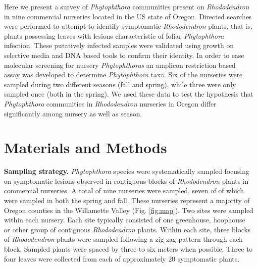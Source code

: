 \documentclass[12pt]{article}
\begin{document}
Here we present a survey of \emph{Phytophthora} communities present on \emph{Rhododendron} in nine commercial nurseries located in the US state of Oregon.  Directed searches were performed to attempt to identify symptomatic \emph{Rhododendron} plants, that is, plants possessing leaves with lesions characteristic of foliar \emph{Phytophthora} infection.  These putatively infected samples were validated using growth on selective media and DNA based tools to confirm their identity.  In order to ease molecular screening for nursery \emph{Phytophthoras} an amplicon restriction based assay was developed to determine \emph{Phytophthora} taxa.  Six of the nurseries were sampled during two different seasons (fall and spring), while three were only sampled once (both in the spring).  We used these data to test the hypothesis that \emph{Phytophthora} communities in \emph{Rhododendron} nurseries in Oregon differ significantly among nursery as well as season.


\section*{\sffamily\normalsize{Materials and Methods}}


\textbf{Sampling strategy.} \emph{Phytophthora} species were systematically sampled focusing on symptomatic lesions observed in contiguous blocks of \emph{Rhododendron} plants in commercial nurseries.  A total of nine nurseries were sampled, seven of of which were sampled in both  the spring and fall.  These nurseries represent a majority of Oregon counties in the Willamette Valley (Fig. \ref{fig:map}).  Two sites were sampled within each nursery.  Each site typically consisted of one greenhouse, hoophouse or other group of contiguous \emph{Rhododendron} plants.  Within each site, three blocks of \emph{Rhododendron} plants were sampled following a zig-zag pattern through each block.  Sampled plants were spaced by three to six meters when possible.  Three to four leaves were collected from each of approximately 20 symptomatic plants.
\end{document}
